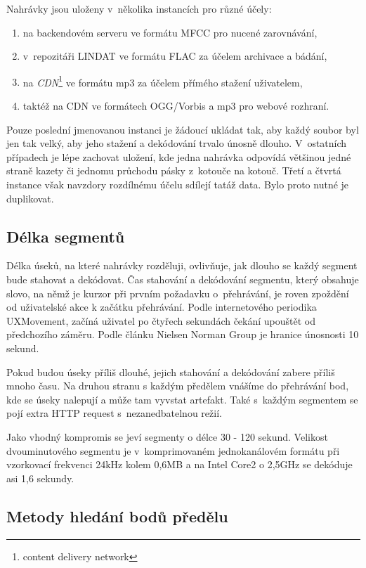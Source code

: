 Nahrávky jsou uloženy v~několika instancích pro různé účely:

\begin{enumerate}
\item{na backendovém serveru ve formátu MFCC pro nucené zarovnávání,}
\item{v~repozitáři LINDAT ve formátu FLAC za účelem archivace a bádání,}
\item{na {\em CDN}\footnote{content delivery network} ve formátu mp3 za účelem přímého stažení uživatelem,}
\item{taktéž na CDN ve formátech OGG/Vorbis a mp3 pro webové rozhraní.}
\end{enumerate}

Pouze poslední jmenovanou instanci je žádoucí ukládat tak, aby každý soubor byl
jen tak velký, aby jeho stažení a dekódování trvalo únosně dlouho. V~ostatních
případech je lépe zachovat uložení, kde jedna nahrávka odpovídá většinou
jedné straně kazety či jednomu průchodu pásky z~kotouče na kotouč. Třetí a čtvrtá
instance však navzdory rozdílnému účelu sdílejí tatáž data. Bylo proto nutné je
duplikovat.

\subsection{Délka segmentů}

Délka úseků, na které nahrávky rozděluji, ovlivňuje, jak dlouho se každý segment
bude stahovat a dekódovat.  Čas stahování a dekódování segmentu, který obsahuje
slovo, na němž je kurzor při prvním požadavku o~přehrávání, je roven zpoždění od
uživatelské akce k začátku přehrávání. Podle internetového periodika
UXMovement\cite{foursecondrule}, začíná uživatel po čtyřech sekundách čekání
upouštět od předchozího záměru. Podle článku Nielsen Norman
Group\cite{websiteresponsetimes} je hranice únosnosti 10 sekund.

Pokud budou úseky příliš dlouhé, jejich stahování a dekódování zabere příliš
mnoho času. Na druhou stranu s každým předělem vnášíme do přehrávání bod, kde se
úseky nalepují a může tam vyvstat artefakt. Také s~každým segmentem se pojí
extra HTTP request s~nezanedbatelnou režií.

Jako vhodný kompromis se jeví segmenty o délce 30 - 120 sekund. Velikost
dvouminutového segmentu je v~komprimovaném jednokanálovém formátu při vzorkovací
frekvenci 24kHz kolem 0,6MB a na Intel Core2 o 2,5GHz se dekóduje asi 1,6
sekundy.

\subsection{Metody hledání bodů předělu}

